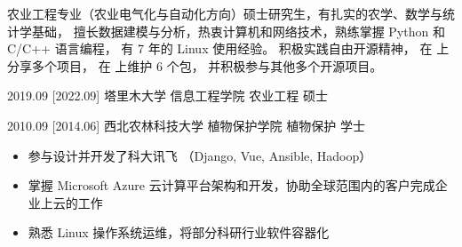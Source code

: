 \documentclass[zh]{resume}
\begin{document}
\makeheader

{\onehalfspacing\hspace{2em}%
农业工程专业（农业电气化与自动化方向）硕士研究生，有扎实的农学、数学与统计学基础，
擅长数据建模与分析，热衷计算机和网络技术，熟练掌握 Python 和 C/C++ 语言编程，
有 7 年的 Linux 使用经验。
积极实践自由开源精神，
在  上分享多个项目，
在  上维护 6 个包，
并积极参与其他多个开源项目。
\par}

\begin{competences}
\end{competences}

\begin{educations}
  \education%
    {2019.09}%
    [2022.09]%
    {塔里木大学}%
    {信息工程学院}%
    {农业工程}%
    {硕士}

  \separator{0.5ex}
  \education%
    {2010.09}%
    [2014.06]%
    {西北农林科技大学}%
    {植物保护学院}%
    {植物保护}%
    {学士}
\end{educations}

\begin{itemize}
  \item 参与设计并开发了科大讯飞 
    （Django, Vue, Ansible, Hadoop）
  \item 掌握 Microsoft Azure 云计算平台架构和开发，协助全球范围内的客户完成企业上云的工作
  \item 熟悉 Linux 操作系统运维，将部分科研行业软件容器化
\end{itemize}
\end{document}
